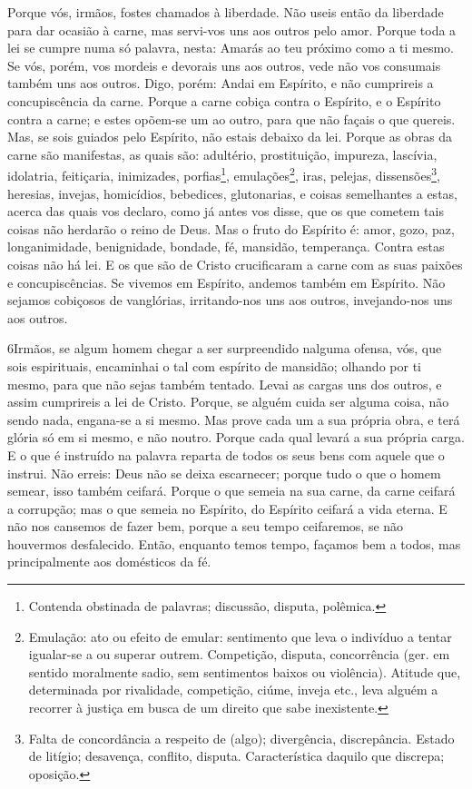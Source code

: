 Porque vós, irmãos, fostes chamados à liberdade. Não useis então
da liberdade para dar ocasião à carne, mas servi-vos uns aos outros
pelo amor. Porque toda a lei se cumpre numa só palavra,
nesta: Amarás ao teu próximo como a ti mesmo. Se vós, porém,
vos mordeis e devorais uns aos outros, vede não vos consumais também
uns aos outros. Digo, porém: Andai em Espírito, e não
cumprireis a concupiscência da carne. Porque a carne cobiça
contra o Espírito, e o Espírito contra a carne; e estes opõem-se um
ao outro, para que não façais o que quereis. Mas, se sois
guiados pelo Espírito, não estais debaixo da lei. Porque as
obras da carne são manifestas, as quais são: adultério,
prostituição, impureza, lascívia, idolatria, feitiçaria,
inimizades, porfias\footnote{Contenda obstinada de palavras;
discussão, disputa, polêmica.}, emulações\footnote{Emulação: ato ou
efeito de emular: sentimento que leva o indivíduo a tentar
igualar-se a ou superar outrem. Competição, disputa, concorrência
(ger. em sentido moralmente sadio, sem sentimentos baixos ou
violência). Atitude que, determinada por rivalidade, competição,
ciúme, inveja etc., leva alguém a recorrer à justiça em busca de um
direito que sabe inexistente.}, iras, pelejas,
dissensões\footnote{Falta de concordância a respeito de (algo);
divergência, discrepância. Estado de litígio; desavença, conflito,
disputa. Característica daquilo que discrepa; oposição.}, heresias,
invejas, homicídios, bebedices, glutonarias, e coisas
semelhantes a estas, acerca das quais vos declaro, como já antes vos
disse, que os que cometem tais coisas não herdarão o reino de Deus.
Mas o fruto do Espírito é: amor, gozo, paz, longanimidade,
benignidade, bondade, fé, mansidão, temperança. Contra estas
coisas não há lei. E os que são de Cristo crucificaram a
carne com as suas paixões e concupiscências. Se vivemos em
Espírito, andemos também em Espírito. Não sejamos cobiçosos
de vanglórias, irritando-nos uns aos outros, invejando-nos uns aos
outros.

\medskip

\lettrine{6} Irmãos, se algum homem chegar a ser surpreendido
nalguma ofensa, vós, que sois espirituais, encaminhai o tal com
espírito de mansidão; olhando por ti mesmo, para que não sejas
também tentado. Levai as cargas uns dos outros, e assim
cumprireis a lei de Cristo. Porque, se alguém cuida ser alguma
coisa, não sendo nada, engana-se a si mesmo. Mas prove cada um a
sua própria obra, e terá glória só em si mesmo, e não noutro.
Porque cada qual levará a sua própria carga. E o que é
instruído na palavra reparta de todos os seus bens com aquele que o
instrui. Não erreis: Deus não se deixa escarnecer; porque tudo o
que o homem semear, isso também ceifará. Porque o que semeia na
sua carne, da carne ceifará a corrupção; mas o que semeia no
Espírito, do Espírito ceifará a vida eterna. E não nos cansemos
de fazer bem, porque a seu tempo ceifaremos, se não houvermos
desfalecido. Então, enquanto temos tempo, façamos bem a
todos, mas principalmente aos domésticos da fé.

